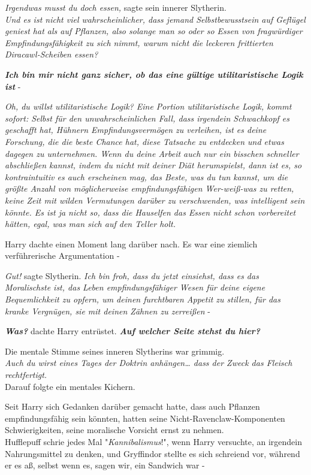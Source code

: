 {\emph{Irgendwas musst du doch essen,} sagte sein innerer Slytherin.\\ \emph{Und es ist nicht viel wahrscheinlicher, dass jemand Selbstbewusstsein auf Geflügel geniest hat als auf Pflanzen, also solange man so oder so Essen von fragwürdiger Empfindungsfähigkeit zu sich nimmt, warum nicht die leckeren frittierten Diracawl-Scheiben essen?}

\textbf{\emph{Ich bin mir nicht ganz sicher, ob das eine gültige utilitaristische Logik ist}} -

\emph{Oh, du willst utilitaristische Logik? Eine Portion utilitaristische Logik, kommt sofort: Selbst für den unwahrscheinlichen Fall, dass irgendein Schwachkopf es geschafft hat, Hühnern Empfindungsvermögen zu verleihen, ist es deine Forschung, die die beste Chance hat, diese Tatsache zu entdecken und etwas dagegen zu unternehmen. Wenn du deine Arbeit auch nur ein bisschen schneller abschließen kannst, indem du nicht mit deiner Diät herumspielst, dann ist es, so kontraintuitiv es auch erscheinen mag, das Beste, was du tun kannst, um die größte Anzahl von möglicherweise empfindungsfähigen Wer-weiß-was zu retten, keine Zeit mit wilden Vermutungen darüber zu verschwenden, was intelligent sein könnte. Es ist ja nicht so, dass die Hauselfen das Essen nicht schon vorbereitet hätten, egal, was man sich auf den Teller holt.}

Harry dachte einen Moment lang darüber nach. Es war eine ziemlich verführerische Argumentation -

\emph{Gut!} sagte Slytherin. \emph{Ich bin froh, dass du jetzt einsiehst, dass es das Moralischste ist, das Leben empfindungsfähiger Wesen für deine eigene Bequemlichkeit zu opfern, um deinen furchtbaren Appetit zu stillen, für das kranke Vergnügen, sie mit deinen Zähnen zu zerreißen} -

\textbf{\emph{Was?}} dachte Harry entrüstet. \textbf{\emph{Auf welcher Seite stehst du hier?}}

Die mentale Stimme seines inneren Slytherins war grimmig.\\ \emph{Auch du wirst eines Tages der Doktrin anhängen… dass der Zweck das Fleisch rechtfertigt.}\\ Darauf folgte ein mentales Kichern.

Seit Harry sich Gedanken darüber gemacht hatte, dass auch Pflanzen empfindungsfähig sein könnten, hatten seine Nicht-Ravenclaw-Komponenten Schwierigkeiten, seine moralische Vorsicht ernst zu nehmen.\\ Hufflepuff schrie jedes Mal "\emph{Kannibalismus}!", wenn Harry versuchte, an irgendein Nahrungsmittel zu denken, und Gryffindor stellte es sich schreiend vor, während er es aß, selbst wenn es, sagen wir, ein Sandwich war -

}
